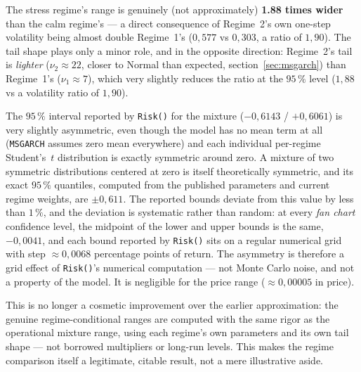 \documentclass[12pt,a4paper]{article}
\begin{document}
\vspace{0.3cm}

The stress regime's range is genuinely (not approximately)
\textbf{1.88 times wider} than the calm regime's --- a
direct consequence of Regime~2's own one-step volatility
being almost double Regime~1's ($0{,}577$ vs
$0{,}303$, a ratio of $1{,}90$). The tail shape plays only a
minor role, and in the opposite direction: Regime~2's tail is
\emph{lighter} ($\nu_2 \approx 22$, closer to Normal than
expected, section~\ref{sec:msgarch}) than Regime~1's
($\nu_1 \approx 7$), which very slightly reduces the ratio at the
$95\,\%$ level ($1{,}88$ vs a volatility ratio of $1{,}90$).

\vspace{0.3cm}

\begin{limitbox}
	The $95\,\%$ interval reported by \texttt{Risk()} for the mixture
	($-0{,}6143$ / $+0{,}6061$) is very slightly asymmetric, even
	though the model has no mean term at all (\texttt{MSGARCH}
	assumes zero mean everywhere) and each individual per-regime
	Student's~$t$ distribution is exactly symmetric
	around zero. A mixture of two symmetric distributions centered
	at zero is itself theoretically symmetric, and its exact
	$95\,\%$ quantiles, computed from the published parameters and
	current regime weights, are $\pm 0{,}611$. The reported
	bounds deviate from this value by less than $1\,\%$, and the
	deviation is systematic rather than random: at every
	\emph{fan chart} confidence level, the midpoint of the lower
	and upper bounds is the same, $-0{,}0041$, and each bound reported by
	\texttt{Risk()} sits on a regular numerical grid with step
	$\approx 0{,}0068$ percentage points of return. The asymmetry is
	therefore a grid effect of \texttt{Risk()}'s numerical computation --- not
	Monte Carlo noise, and not a property of the model. It is
	negligible for the price range ($\approx 0{,}00005$ in price).
\end{limitbox}


\vspace{0.3cm}

This is no longer a cosmetic improvement over the earlier
approximation: the genuine regime-conditional ranges are
computed with the same rigor as the operational mixture range,
using each regime's own parameters and its own
tail shape --- not borrowed multipliers or long-run
levels. This makes the regime comparison itself
a legitimate, citable result, not a mere illustrative aside.
\end{document}

